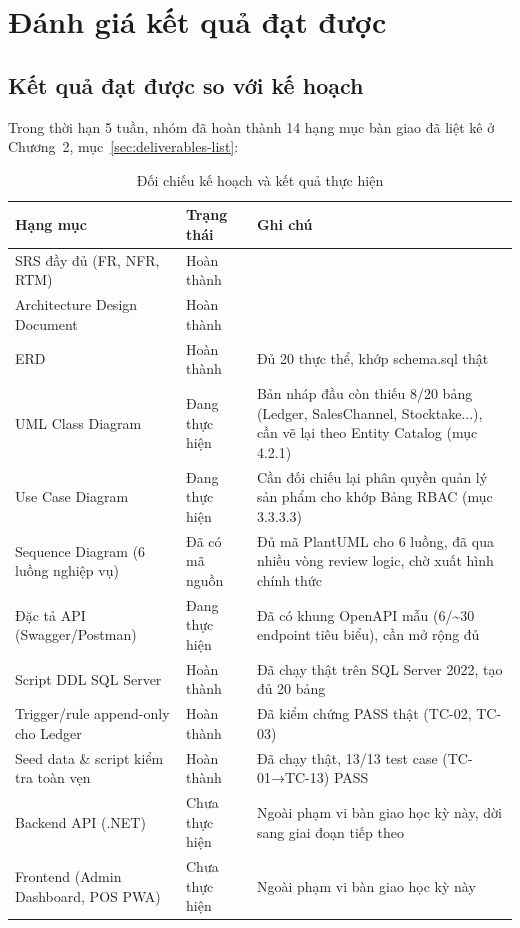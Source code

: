 \section{Đánh giá kết quả đạt được}

\subsection{Kết quả đạt được so với kế hoạch}
Trong thời hạn 5 tuần, nhóm đã hoàn thành 14 hạng mục bàn giao đã liệt kê ở Chương~2, mục~\ref{sec:deliverables-list}:

\begin{table}[htbp]
    \centering
    \small
    \caption{Đối chiếu kế hoạch và kết quả thực hiện}
    \begin{tabularx}{\textwidth}{|Y|p{2.2cm}|Y|}
        \hline
        \textbf{Hạng mục} & \textbf{Trạng thái} & \textbf{Ghi chú} \\
        \hline
        SRS đầy đủ (FR, NFR, RTM) & Hoàn thành & \\
        \hline
        Architecture Design Document & Hoàn thành & \\
        \hline
                ERD & Hoàn thành & Đủ 20 thực thể, khớp schema.sql thật \\
        \hline
        UML Class Diagram & Đang thực hiện & Bản nháp đầu còn thiếu 8/20 bảng (Ledger, SalesChannel, Stocktake...), cần vẽ lại theo Entity Catalog (mục 4.2.1) \\
        \hline
        Use Case Diagram & Đang thực hiện & Cần đối chiếu lại phân quyền quản lý sản phẩm cho khớp Bảng RBAC (mục 3.3.3.3) \\
        \hline
        Sequence Diagram (6 luồng nghiệp vụ) & Đã có mã nguồn & Đủ mã PlantUML cho 6 luồng, đã qua nhiều vòng review logic, chờ xuất hình chính thức \\
        \hline
        Đặc tả API (Swagger/Postman) & Đang thực hiện & Đã có khung OpenAPI mẫu (6/\textasciitilde30 endpoint tiêu biểu), cần mở rộng đủ \\
        \hline
        Script DDL SQL Server & Hoàn thành & Đã chạy thật trên SQL Server 2022, tạo đủ 20 bảng \\
        \hline
        Trigger/rule append-only cho Ledger & Hoàn thành & Đã kiểm chứng PASS thật (TC-02, TC-03) \\
        \hline
        Seed data \& script kiểm tra toàn vẹn & Hoàn thành & Đã chạy thật, 13/13 test case (TC-01→TC-13) PASS \\
        \hline
        Backend API (.NET) & Chưa thực hiện & Ngoài phạm vi bàn giao học kỳ này, dời sang giai đoạn tiếp theo \\
        \hline
        Frontend (Admin Dashboard, POS PWA) & Chưa thực hiện & Ngoài phạm vi bàn giao học kỳ này \\
        \hline
    \end{tabularx}
\end{table}

